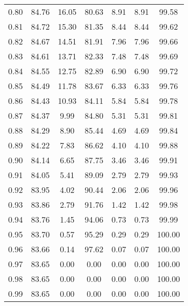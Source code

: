 \begin{tabular}{|c|c|c|c|c|c|c|}
      0.80 &     84.76 &     16.05 &      80.63 &    8.91 &       8.91 &         99.58 \\
      0.81 &     84.72 &     15.30 &      81.35 &    8.44 &       8.44 &         99.62 \\
      0.82 &     84.67 &     14.51 &      81.91 &    7.96 &       7.96 &         99.66 \\
      0.83 &     84.61 &     13.71 &      82.33 &    7.48 &       7.48 &         99.69 \\
      0.84 &     84.55 &     12.75 &      82.89 &    6.90 &       6.90 &         99.72 \\
      0.85 &     84.49 &     11.78 &      83.67 &    6.33 &       6.33 &         99.76 \\
      0.86 &     84.43 &     10.93 &      84.11 &    5.84 &       5.84 &         99.78 \\
      0.87 &     84.37 &      9.99 &      84.80 &    5.31 &       5.31 &         99.81 \\
      0.88 &     84.29 &      8.90 &      85.44 &    4.69 &       4.69 &         99.84 \\
      0.89 &     84.22 &      7.83 &      86.62 &    4.10 &       4.10 &         99.88 \\
      0.90 &     84.14 &      6.65 &      87.75 &    3.46 &       3.46 &         99.91 \\
      0.91 &     84.05 &      5.41 &      89.09 &    2.79 &       2.79 &         99.93 \\
      0.92 &     83.95 &      4.02 &      90.44 &    2.06 &       2.06 &         99.96 \\
      0.93 &     83.86 &      2.79 &      91.76 &    1.42 &       1.42 &         99.98 \\
      0.94 &     83.76 &      1.45 &      94.06 &    0.73 &       0.73 &         99.99 \\
      0.95 &     83.70 &      0.57 &      95.29 &    0.29 &       0.29 &        100.00 \\
      0.96 &     83.66 &      0.14 &      97.62 &    0.07 &       0.07 &        100.00 \\
      0.97 &     83.65 &      0.00 &       0.00 &    0.00 &       0.00 &        100.00 \\
      0.98 &     83.65 &      0.00 &       0.00 &    0.00 &       0.00 &        100.00 \\
      0.99 &     83.65 &      0.00 &       0.00 &    0.00 &       0.00 &        100.00 \\
\bottomrule
\end{tabular}
